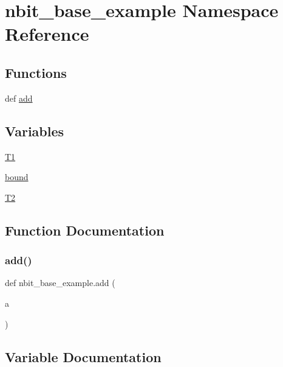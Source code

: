 \hypertarget{namespacenbit__base__example}{}\section{nbit\+\_\+base\+\_\+example Namespace Reference}
\label{namespacenbit__base__example}
\subsection*{Functions}
\begin{DoxyCompactItemize}
\item 
def \hyperlink{namespacenbit__base__example_a761601c24928f1bebb16335415598f88}{add}
\end{DoxyCompactItemize}
\subsection*{Variables}
\begin{DoxyCompactItemize}
\item 
\hyperlink{namespacenbit__base__example_aafea95e425e1f98a49764b50d5702866}{T1}
\item 
\hyperlink{namespacenbit__base__example_a7608b562bc033857e8aee519707880d4}{bound}
\item 
\hyperlink{namespacenbit__base__example_a38094d786f47b089005a1ff7711c3511}{T2}
\end{DoxyCompactItemize}


\subsection{Function Documentation}
\mbox{\label{namespacenbit__base__example_a761601c24928f1bebb16335415598f88}} 
\subsubsection{\texorpdfstring{add()}{add()}}
{\footnotesize\ttfamily def nbit\+\_\+base\+\_\+example.\+add (\begin{DoxyParamCaption}\item[{}]{a }\end{DoxyParamCaption})}



\subsection{Variable Documentation}
\mbox{\label{namespacenbit__base__example_a7608b562bc033857e8aee519707880d4}} 
